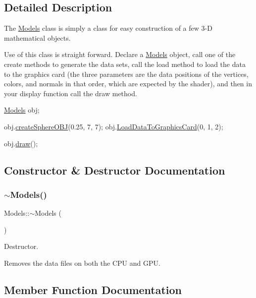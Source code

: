 \subsection{Detailed Description}
The \hyperlink{class_models}{Models} class is simply a class for easy construction of a few 3-\/D mathematical objects. 

Use of this class is straight forward. Declare a \hyperlink{class_models}{Models} object, call one of the create methods to generate the data sets, call the load method to load the data to the graphics card (the three parameters are the data positions of the vertices, colors, and normals in that order, which are expected by the shader), and then in your display function call the draw method.


\begin{DoxyCode}
\hyperlink{class_models}{Models} obj;

obj.\hyperlink{class_models_a815ab35b893796d6d214f1bc68588dc1}{createSphereOBJ}(0.25, 7, 7);
obj.\hyperlink{class_models_a37639ded69e396965605f32b7a977166}{LoadDataToGraphicsCard}(0, 1, 2);

obj.\hyperlink{class_models_a302e2de33467a2cdb283c9b34ced49b6}{draw}();
\end{DoxyCode}
 

\subsection{Constructor \& Destructor Documentation}
\mbox{\label{class_models_aef02b88508c7cf66170381982e57ce3e}} 
\subsubsection{\texorpdfstring{$\sim$\+Models()}{~Models()}}
{\footnotesize\ttfamily Models\+::$\sim$\+Models (\begin{DoxyParamCaption}{ }\end{DoxyParamCaption})}



Destructor. 

Removes the data files on both the C\+PU and G\+PU. 

\subsection{Member Function Documentation}
\mbox{\label{class_models_a4f35e25b5362120188dab01cd3e146cd}} 
